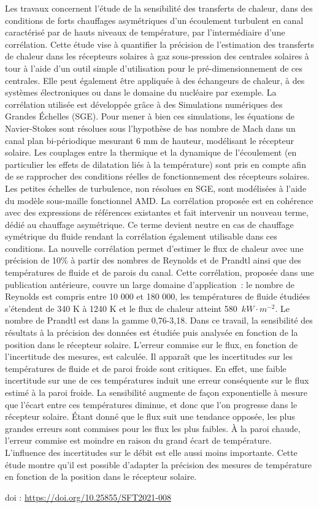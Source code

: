 {\normalsize
Les travaux concernent l'étude de la sensibilité des transferts de chaleur, dans des conditions de forts chauffages asymétriques d'un écoulement turbulent en canal caractérisé par de hauts niveaux de température, par l'intermédiaire d'une corrélation. Cette étude vise à quantifier la précision de l'estimation des transferts de chaleur dans les récepteurs solaires à gaz sous-pression des centrales solaires à tour à l'aide d'un outil simple d'utilisation pour le pré-dimensionnement de ces centrales. Elle peut également être appliquée à des échangeurs de chaleur, à des systèmes électroniques ou dans le domaine du nucléaire par exemple. La corrélation utilisée est développée grâce à des Simulations numériques des Grandes Échelles (SGE). Pour mener à bien ces simulations, les équations de Navier-Stokes sont résolues sous l'hypothèse de bas nombre de Mach dans un canal plan bi-périodique mesurant 6 mm de hauteur, modélisant le récepteur solaire. Les couplages entre la thermique et la dynamique de l'écoulement (en particulier les effets de dilatation liés à la température) sont pris en compte afin de se rapprocher des conditions réelles de fonctionnement des récepteurs solaires. Les petites échelles de turbulence, non résolues en SGE, sont modélisées à l'aide du modèle sous-maille fonctionnel AMD. La corrélation proposée est en cohérence avec des expressions de références existantes et fait intervenir un nouveau terme, dédié au chauffage asymétrique. Ce terme devient neutre en cas de chauffage symétrique du fluide rendant la corrélation également utilisable dans ces conditions. La nouvelle corrélation permet d'estimer le flux de chaleur avec une précision de 10\% à partir des nombres de Reynolds et de Prandtl ainsi que des températures de fluide et de parois du canal. Cette corrélation, proposée dans une publication antérieure, couvre un large domaine d'application : le nombre de Reynolds est compris entre 10 000 et 180 000, les températures de fluide étudiées s'étendent de 340 K à 1240 K et le flux de chaleur atteint 580~$\unit{kW\cdot m^{-2}}$. Le nombre de Prandtl est dans la gamme 0,76-3,18. Dans ce travail, la sensibilité des résultats à la précision des données est étudiée puis analysée en fonction de la position dans le récepteur solaire. L'erreur commise sur le flux, en fonction de l'incertitude des mesures, est calculée. Il apparaît que les incertitudes sur les températures de fluide et de paroi froide sont critiques. En effet, une faible incertitude sur une de ces températures induit une erreur conséquente sur le flux estimé à la paroi froide. La sensibilité augmente de façon exponentielle à mesure que l'écart entre ces températures diminue, et donc que l'on progresse dans le récepteur solaire. Étant donné que le flux suit une tendance opposée, les plus grandes erreurs sont commises pour les flux les plus faibles. À la paroi chaude, l'erreur commise est moindre en raison du grand écart de température. L'influence des incertitudes sur le débit est elle aussi moins importante. Cette étude montre qu'il est possible d'adapter la précision des mesures de température en fonction de la position dans le récepteur solaire.

 \vfill doi : \url{https://doi.org/10.25855/SFT2021-008}

}
 
